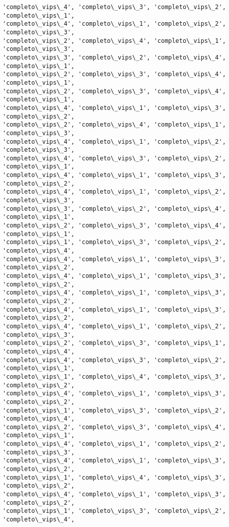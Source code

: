 \documentclass[11pt]{article}
\begin{document}
\begin{Verbatim}[commandchars=\\\{\}]
'completo\_vips\_4', 'completo\_vips\_3', 'completo\_vips\_2', 'completo\_vips\_1',
'completo\_vips\_4', 'completo\_vips\_1', 'completo\_vips\_2', 'completo\_vips\_3',
'completo\_vips\_2', 'completo\_vips\_4', 'completo\_vips\_1', 'completo\_vips\_3',
'completo\_vips\_3', 'completo\_vips\_2', 'completo\_vips\_4', 'completo\_vips\_1',
'completo\_vips\_2', 'completo\_vips\_3', 'completo\_vips\_4', 'completo\_vips\_1',
'completo\_vips\_2', 'completo\_vips\_3', 'completo\_vips\_4', 'completo\_vips\_1',
'completo\_vips\_4', 'completo\_vips\_1', 'completo\_vips\_3', 'completo\_vips\_2',
'completo\_vips\_2', 'completo\_vips\_4', 'completo\_vips\_1', 'completo\_vips\_3',
'completo\_vips\_4', 'completo\_vips\_1', 'completo\_vips\_2', 'completo\_vips\_3',
'completo\_vips\_4', 'completo\_vips\_3', 'completo\_vips\_2', 'completo\_vips\_1',
'completo\_vips\_4', 'completo\_vips\_1', 'completo\_vips\_3', 'completo\_vips\_2',
'completo\_vips\_4', 'completo\_vips\_1', 'completo\_vips\_2', 'completo\_vips\_3',
'completo\_vips\_3', 'completo\_vips\_2', 'completo\_vips\_4', 'completo\_vips\_1',
'completo\_vips\_2', 'completo\_vips\_3', 'completo\_vips\_4', 'completo\_vips\_1',
'completo\_vips\_1', 'completo\_vips\_3', 'completo\_vips\_2', 'completo\_vips\_4',
'completo\_vips\_4', 'completo\_vips\_1', 'completo\_vips\_3', 'completo\_vips\_2',
'completo\_vips\_4', 'completo\_vips\_1', 'completo\_vips\_3', 'completo\_vips\_2',
'completo\_vips\_4', 'completo\_vips\_1', 'completo\_vips\_3', 'completo\_vips\_2',
'completo\_vips\_4', 'completo\_vips\_1', 'completo\_vips\_3', 'completo\_vips\_2',
'completo\_vips\_4', 'completo\_vips\_1', 'completo\_vips\_2', 'completo\_vips\_3',
'completo\_vips\_2', 'completo\_vips\_3', 'completo\_vips\_1', 'completo\_vips\_4',
'completo\_vips\_4', 'completo\_vips\_3', 'completo\_vips\_2', 'completo\_vips\_1',
'completo\_vips\_1', 'completo\_vips\_4', 'completo\_vips\_3', 'completo\_vips\_2',
'completo\_vips\_4', 'completo\_vips\_1', 'completo\_vips\_3', 'completo\_vips\_2',
'completo\_vips\_1', 'completo\_vips\_3', 'completo\_vips\_2', 'completo\_vips\_4',
'completo\_vips\_2', 'completo\_vips\_3', 'completo\_vips\_4', 'completo\_vips\_1',
'completo\_vips\_4', 'completo\_vips\_1', 'completo\_vips\_2', 'completo\_vips\_3',
'completo\_vips\_4', 'completo\_vips\_1', 'completo\_vips\_3', 'completo\_vips\_2',
'completo\_vips\_1', 'completo\_vips\_4', 'completo\_vips\_3', 'completo\_vips\_2',
'completo\_vips\_4', 'completo\_vips\_1', 'completo\_vips\_3', 'completo\_vips\_2',
'completo\_vips\_1', 'completo\_vips\_3', 'completo\_vips\_2', 'completo\_vips\_4',

\end{Verbatim}
\end{document}
